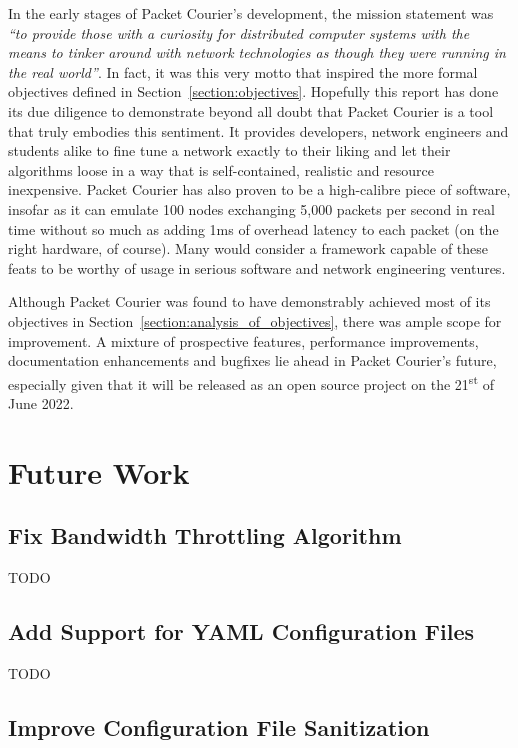 In the early stages of Packet Courier's development, the mission statement was \emph{``to provide those with a
curiosity for distributed computer systems with the means to tinker around with network technologies as though they
were running in the real world''}. In fact, it was this very motto that inspired the more formal objectives defined
in Section~\ref{section:objectives}. Hopefully this report has done its due diligence to demonstrate beyond all doubt
that Packet Courier is a tool that truly embodies this sentiment. It provides developers, network engineers and
students alike to fine tune a network exactly to their liking and let their algorithms loose in a way that is
self-contained, realistic and resource inexpensive. Packet Courier has also proven to be a high-calibre piece of
software, insofar as it can emulate 100 nodes exchanging 5,000 packets per second in real time without so much as
adding 1ms of overhead latency to each packet (on the right hardware, of course). Many would consider a framework
capable of these feats to be worthy of usage in serious software and network engineering ventures.

Although Packet Courier was found to have demonstrably achieved most of its objectives in
Section~\ref{section:analysis_of_objectives}, there was ample scope for improvement. A mixture of prospective
features, performance improvements, documentation enhancements and bugfixes lie ahead in Packet Courier's future,
especially given that it will be released as an open source project on the 21\textsuperscript{st} of June 2022.


\section{Future Work}\label{section:future_work}

\subsection{Fix Bandwidth Throttling Algorithm}\label{subsection:fix_bandwidth_throttling_algorithm}

TODO

\subsection{Add Support for YAML Configuration Files}\label{subsection:support_for_yaml_configuration_files}

TODO

\subsection{Improve Configuration File Sanitization}\label{subsection:improve_configuration_file_sanitization}

